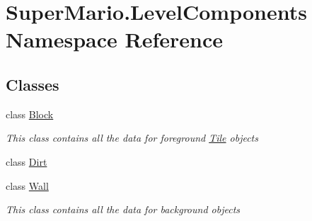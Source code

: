 \hypertarget{namespace_super_mario_1_1_level_components}{}\section{Super\+Mario.\+Level\+Components Namespace Reference}
\label{namespace_super_mario_1_1_level_components}
\subsection*{Classes}
\begin{DoxyCompactItemize}
\item 
class \mbox{\hyperlink{class_super_mario_1_1_level_components_1_1_block}{Block}}
\begin{DoxyCompactList}\small\item\em This class contains all the data for foreground \mbox{\hyperlink{class_super_mario_1_1_tile}{Tile}} objects \end{DoxyCompactList}\item 
class \mbox{\hyperlink{class_super_mario_1_1_level_components_1_1_dirt}{Dirt}}
\item 
class \mbox{\hyperlink{class_super_mario_1_1_level_components_1_1_wall}{Wall}}
\begin{DoxyCompactList}\small\item\em This class contains all the data for background objects \end{DoxyCompactList}\end{DoxyCompactItemize}
